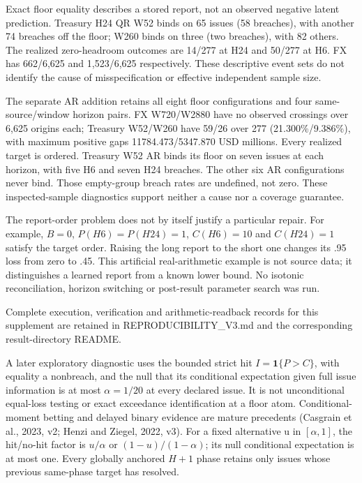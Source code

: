 \documentclass[11pt,a4paper]{article}
\begin{document}
Exact floor equality describes a stored report, not an observed negative latent prediction. Treasury H24 QR W52 binds on 65 issues (58 breaches), with another 74 breaches off the floor; W260 binds on three (two breaches), with 82 others. The realized zero-headroom outcomes are 14/277 at H24 and 50/277 at H6. FX has 662/6,625 and 1,523/6,625 respectively. These descriptive event sets do not identify the cause of misspecification or effective independent sample size.

The separate AR addition retains all eight floor configurations and four same-source/window horizon pairs. FX W720/W2880 have no observed crossings over 6,625 origins each; Treasury W52/W260 have 59/26 over 277 (21.300\%/9.386\%), with maximum positive gaps 11784.473/5347.870 USD millions. Every realized target is ordered. Treasury W52 AR binds its floor on seven issues at each horizon, with five H6 and seven H24 breaches. The other six AR configurations never bind. Those empty-group breach rates are undefined, not zero. These inspected-sample diagnostics support neither a cause nor a coverage guarantee.

The report-order problem does not by itself justify a particular repair. For example, \(B=0\), \(P(H6)=P(H24)=1\), \(C(H6)=10\) and \(C(H24)=1\) satisfy the target order. Raising the long report to the short one changes its .95 loss from zero to .45. This artificial real-arithmetic example is not source data; it distinguishes a learned report from a known lower bound. No isotonic reconciliation, horizon switching or post-result parameter search was run.

Complete execution, verification and arithmetic-readback records for this supplement are retained in REPRODUCIBILITY\_V3.md and the corresponding result-directory README.

A later exploratory diagnostic uses the bounded strict hit \(I=\mathbf1\{P>C\}\), with equality a nonbreach, and the null that its conditional expectation given full issue information is at most \(\alpha=1/20\) at every declared issue. It is not unconditional equal-loss testing or exact exceedance identification at a floor atom. Conditional-moment betting and delayed binary evidence are mature precedents (Casgrain et al., 2023, v2; Henzi and Ziegel, 2022, v3). For a fixed alternative u in \([\alpha,1]\), the hit/no-hit factor is \(u/\alpha\) or \((1-u)/(1-\alpha)\); its null conditional expectation is at most one. Every globally anchored \(H+1\) phase retains only issues whose previous same-phase target has resolved.
\end{document}
